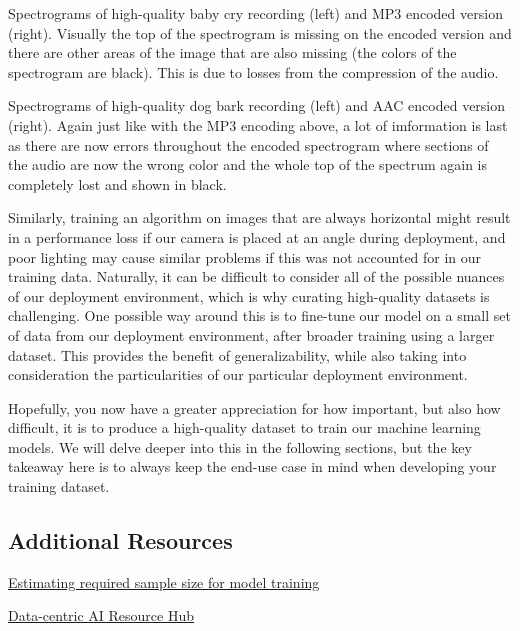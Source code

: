  
    Spectrograms of high-quality baby cry recording (left) and MP3 encoded version (right). Visually the top of the spectrogram is missing on the encoded version and there are other areas of the image that are also missing (the colors of the spectrogram are black). This is due to losses from the compression of the audio.

    
    Spectrograms of high-quality dog bark recording (left) and AAC encoded version (right). Again just like with the MP3 encoding above, a lot of imformation is last as there are now errors throughout the encoded spectrogram where sections of the audio are now the wrong color and the whole top of the spectrum again is completely lost and shown in black.
    
    Similarly, training an algorithm on images that are always horizontal might result in a performance loss if our camera is placed at an angle during deployment, and poor lighting may cause similar problems if this was not accounted for in our training data. Naturally, it can be difficult to consider all of the possible nuances of our deployment environment, which is why curating high-quality datasets is challenging. One possible way around this is to fine-tune our model on a small set of data from our deployment environment, after broader training using a larger dataset. This provides the benefit of generalizability, while also taking into consideration the particularities of our particular deployment environment.
    
    Hopefully, you now have a greater appreciation for how important, but also how difficult, it is to produce a high-quality dataset to train our machine learning models. We will delve deeper into this in the following sections, but the key takeaway here is to always keep the end-use case in mind when developing your training dataset.    
    
\subsection{Additional Resources}


    \href{https://keras.io/examples/keras_recipes/sample_size_estimate/}{Estimating required sample size for model training}
    
    \href{https://datacentricai.org/}{Data-centric AI Resource Hub}
    

